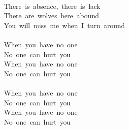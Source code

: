 {\\
There\ is\ absence,\ there\ is\ lack\\
There\ are\ wolves\ here\ abound\\
You\ will\ miss\ me\ when\ I\ turn\ around\\
\\
When\ you\ have\ no\ one\\
No\ one\ can\ hurt\ you\\
When\ you\ have\ no\ one\\
No\ one\ can\ hurt\ you\\
\\
When\ you\ have\ no\ one\\
No\ one\ can\ hurt\ you\\
When\ you\ have\ no\ one\\
No\ one\ can\ hurt\ you}
